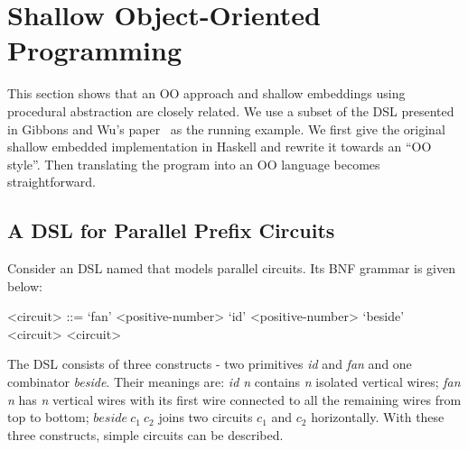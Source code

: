 \section{Shallow Object-Oriented Programming}\label{sec:oo}

\begin{comment}
Weixin writes this part.

Argue that shallow embeddings and straightforward OO 
programs are essentially the same thing. 

Start from a simple shallow DSL in Haskell, 
and iterate throught it until you reach a form 
that looks like an OO program.

Show how todo transformations in Shallow embeddings
using the insight of how to do transformations in OO
programs.

Show the correponding Java programs and the Java program 
with transformation that we can port back to Haskell.
\end{comment}

This section shows that an OO approach and shallow embeddings using
procedural abstraction are closely related.  We use a subset of the
DSL presented in Gibbons and Wu's paper~\cite{gibbons2014folding} as
the running example.  We first give the original shallow embedded
implementation in Haskell and rewrite it towards an ``OO style''.
Then translating the program into an OO language becomes straightforward.

\subsection{A DSL for Parallel Prefix Circuits}
Consider an DSL named \dsl that models parallel circuits.
Its BNF grammar is given below:
\setlength{\grammarindent}{5em} %

\begin{grammar}
<circuit> ::= `fan' <positive-number>
\alt `id' <positive-number>
\alt `beside' <circuit> <circuit>
\end{grammar}

The DSL consists of three constructs - two primitives
\emph{id} and \emph{fan} and one combinator \emph{beside}.
Their meanings are: \emph{id n} contains \emph{n} isolated vertical wires;
\emph{fan n} has \emph{n} vertical wires with its first wire connected to
all the remaining wires from top to bottom; $beside\ c_1\ c_2$ joins two circuits
$c_1$ and $c_2$ horizontally.
With these three constructs, simple circuits can be described.

